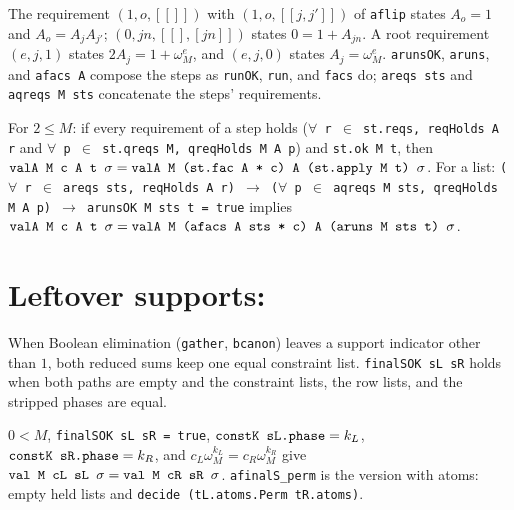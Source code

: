 \noindent The requirement $(1,o,[[]])$ with $(1,o,[[j,j']])$ of \textnormal{\texttt{aflip}} states $A_o=1$ and
$A_o = A_jA_{j'}$; $(0,jn,[[],[jn]])$ states $0 = 1+A_{jn}$. A root requirement $(e,j,1)$ states
$2A_j = 1+\omega_M^e$, and $(e,j,0)$ states $A_j=\omega_M^e$.
\textnormal{\texttt{arunsOK}}, \textnormal{\texttt{aruns}}, and \textnormal{\texttt{afacs A}} compose the steps as \textnormal{\texttt{runOK}}, \textnormal{\texttt{run}},
and \textnormal{\texttt{facs}} do; \textnormal{\texttt{areqs sts}} and \textnormal{\texttt{aqreqs M sts}} concatenate the steps' requirements.

\begin{theorem}\label{thm:lean-pathsum-aruns}
For $2\le M$: if every requirement of a step holds (\textnormal{\texttt{\ensuremath{\forall} r \ensuremath{\in} st.\allowbreak{}reqs,\allowbreak{} reqHolds A r}} and
\textnormal{\texttt{\ensuremath{\forall} p \ensuremath{\in} st.\allowbreak{}qreqs M,\allowbreak{} qreqHolds M A p}}) and \textnormal{\texttt{st.\allowbreak{}ok M t}}, then
$\textnormal{\texttt{valA M c A t \ensuremath{\sigma}}} = \textnormal{\texttt{valA M (\allowbreak{}st.\allowbreak{}fac A * c) A (\allowbreak{}st.\allowbreak{}apply M t) \ensuremath{\sigma}}}$. For a list:
\textnormal{\texttt{(\allowbreak{}\ensuremath{\forall} r \ensuremath{\in} areqs sts,\allowbreak{} reqHolds A r) \ensuremath{\to} (\allowbreak{}\ensuremath{\forall} p \ensuremath{\in} aqreqs M sts,\allowbreak{} qreqHolds M A p) \ensuremath{\to} arunsOK M sts t = true}}
implies $\textnormal{\texttt{valA M c A t \ensuremath{\sigma}}} = \textnormal{\texttt{valA M (\allowbreak{}afacs A sts * c) A (\allowbreak{}aruns M sts t) \ensuremath{\sigma}}}$.
\end{theorem}

\section{Leftover supports: \texorpdfstring{}{PathSumSupport}}\label{sec:lean-pathsum-support}

When Boolean elimination (\textnormal{\texttt{gather}}, \textnormal{\texttt{bcanon}}) leaves a support indicator other than
$1$, both reduced sums keep one equal constraint list. \textnormal{\texttt{finalSOK sL sR}} holds when both paths
are empty and the constraint lists, the row lists, and the stripped phases are equal.
\begin{theorem}
$0<M$, \textnormal{\texttt{finalSOK sL sR = true}}, $\textnormal{\texttt{constK sL.\allowbreak{}phase}} = k_L$, $\textnormal{\texttt{constK sR.\allowbreak{}phase}} = k_R$,
and $c_L\omega_M^{k_L} = c_R\omega_M^{k_R}$ give $\textnormal{\texttt{val M cL sL \ensuremath{\sigma}}} = \textnormal{\texttt{val M cR sR \ensuremath{\sigma}}}$.
\textnormal{\texttt{afinalS\_\allowbreak{}perm}} is the version with atoms: empty held lists and
\textnormal{\texttt{decide (\allowbreak{}tL.\allowbreak{}atoms.\allowbreak{}Perm tR.\allowbreak{}atoms)}}.
\end{theorem}

